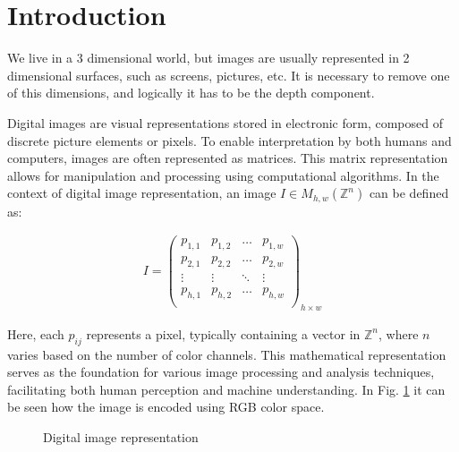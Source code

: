 \section{Introduction}

We live in a 3 dimensional world, but images are usually represented in 2 dimensional surfaces, such as screens, pictures, etc. It is necessary to remove one of this dimensions, and logically it has to be the depth component.

Digital images are visual representations stored in electronic form, composed of discrete picture elements or pixels. To enable interpretation by both humans and computers, images are often represented as matrices. This matrix representation allows for manipulation and processing using computational algorithms. In the context of digital image representation, an image $I \in M_{h,w}\left(\mathbb{Z}^n\right)$ can be defined as:

\begin{gather*}
    I = \begin{pmatrix}
        p_{1,1} & p_{1,2} & \dots & p_{1,w} \\
        p_{2,1} & p_{2,2} & \dots & p_{2,w} \\
        \vdots & \vdots & \ddots & \vdots \\
        p_{h,1} & p_{h,2} & \dots & p_{h,w} \\
    \end{pmatrix}_{h \times w}
\end{gather*}

Here, each $p_{ij}$ represents a pixel, typically containing a vector in $\mathbb{Z}^n$, where $n$ varies based on the number of color channels. This mathematical representation serves as the foundation for various image processing and analysis techniques, facilitating both human perception and machine understanding. In Fig. \ref{fig:digital_image} it can be seen how the image is encoded using RGB color space. 

\begin{figure}[H]
    \centering
    \qquad
    \caption{Digital image representation}
    \label{fig:digital_image}
\end{figure}

